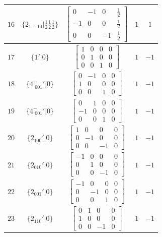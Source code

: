 \documentclass[fleqn,8pt]{jsarticle}
\begin{document}
\begin{longtable}{ccccc}
$ 16 $ & $ \{2{}_{1-10}|\frac{1}{2} \frac{1}{2} \frac{1}{2}\} $ & $ \begin{bmatrix} 0 & -1 & 0 & \frac{1}{2} \\ -1 & 0 & 0 & \frac{1}{2} \\ 0 & 0 & -1 & \frac{1}{2} \end{bmatrix} $ & $ 1 $ & $ 1 $ \\ \hline
$ 17 $ & $ \{1{}'|0\} $ & $ \begin{bmatrix} 1 & 0 & 0 & 0 \\ 0 & 1 & 0 & 0 \\ 0 & 0 & 1 & 0 \end{bmatrix} $ & $ 1 $ & $ -1 $ \\ \hline
$ 18 $ & $ \{4^{+}_{\,\,001}{}'|0\} $ & $ \begin{bmatrix} 0 & -1 & 0 & 0 \\ 1 & 0 & 0 & 0 \\ 0 & 0 & 1 & 0 \end{bmatrix} $ & $ 1 $ & $ -1 $ \\ \hline
$ 19 $ & $ \{4^{-}_{\,\,001}{}'|0\} $ & $ \begin{bmatrix} 0 & 1 & 0 & 0 \\ -1 & 0 & 0 & 0 \\ 0 & 0 & 1 & 0 \end{bmatrix} $ & $ 1 $ & $ -1 $ \\ \hline
$ 20 $ & $ \{2{}_{100}{}'|0\} $ & $ \begin{bmatrix} 1 & 0 & 0 & 0 \\ 0 & -1 & 0 & 0 \\ 0 & 0 & -1 & 0 \end{bmatrix} $ & $ 1 $ & $ -1 $ \\ \hline
$ 21 $ & $ \{2{}_{010}{}'|0\} $ & $ \begin{bmatrix} -1 & 0 & 0 & 0 \\ 0 & 1 & 0 & 0 \\ 0 & 0 & -1 & 0 \end{bmatrix} $ & $ 1 $ & $ -1 $ \\ \hline
$ 22 $ & $ \{2{}_{001}{}'|0\} $ & $ \begin{bmatrix} -1 & 0 & 0 & 0 \\ 0 & -1 & 0 & 0 \\ 0 & 0 & 1 & 0 \end{bmatrix} $ & $ 1 $ & $ -1 $ \\ \hline
$ 23 $ & $ \{2{}_{110}{}'|0\} $ & $ \begin{bmatrix} 0 & 1 & 0 & 0 \\ 1 & 0 & 0 & 0 \\ 0 & 0 & -1 & 0 \end{bmatrix} $ & $ 1 $ & $ -1 $ \\ \hline

\end{longtable}
\end{document}
